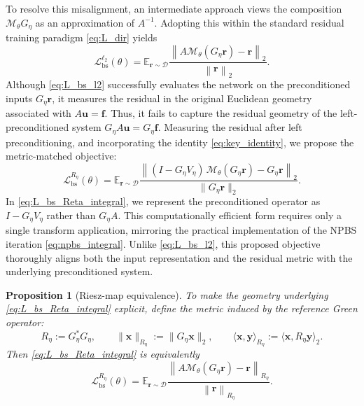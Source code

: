 \documentclass{article}
\providecommand{\E}{\mathbb{E}}
\theoremstyle{plain}
\newtheorem{proposition}{Proposition}[section]
\theoremstyle{remark}
\begin{document}
To resolve this misalignment, an intermediate approach views the composition $\mathcal{M}_\theta G_\eta$ as an approximation of $A^{-1}$. Adopting this within the standard residual training paradigm \eqref{eq:L_dir} yields
\begin{equation}
\mathcal{L}_{\mathrm{bs}}^{\ell_2}(\theta)
=
\E_{\bm r\sim\mathcal{D}}
\frac{
\left\lVert A\mathcal{M}_\theta(G_\eta \bm r)-\bm r\right\rVert_{2}
}{
\left\lVert \bm r\right\rVert_{2}
}.
\label{eq:L_bs_l2}
\end{equation}
Although \eqref{eq:L_bs_l2} successfully evaluates the network on the preconditioned inputs $G_\eta \bm r$, it measures the residual in the original Euclidean geometry associated with $A\bm u=\bm f$. Thus, it fails to capture the residual geometry of the left-preconditioned system $G_\eta A \bm u = G_\eta \bm f$. Measuring the residual after left preconditioning, and incorporating the identity \eqref{eq:key_identity}, we propose the metric-matched objective:
\begin{equation}
\mathcal{L}_{\mathrm{bs}}^{R_\eta}(\theta)
=
\E_{\bm r\sim\mathcal{D}}
\frac{
\left\|
(I-G_\eta V_\eta)\,\mathcal{M}_\theta(G_\eta \bm r)-G_\eta \bm r
\right\|_2
}{
\|G_\eta \bm r\|_2
}.
\label{eq:L_bs_Reta_integral}
\end{equation}
In \eqref{eq:L_bs_Reta_integral}, we represent the preconditioned operator as $I-G_\eta V_\eta$ rather than $G_\eta A$. This computationally efficient form requires only a single transform application, mirroring the practical implementation of the NPBS iteration \eqref{eq:npbs_integral}. Unlike \eqref{eq:L_bs_l2}, this proposed objective thoroughly aligns both the input representation and the residual metric with the underlying preconditioned system.




\begin{proposition}[Riesz-map equivalence]
\label{prop:riesz_map}
To make the geometry underlying \eqref{eq:L_bs_Reta_integral} explicit, define the metric induced by the reference Green operator:
\begin{equation}
R_\eta:=G_\eta^\ast G_\eta,\qquad
\|\bm x\|_{R_\eta}:=\|G_\eta \bm x\|_2,\qquad
\langle \bm x,\bm y\rangle_{R_\eta}:=\langle \bm x,R_\eta \bm y\rangle_2.
\end{equation}
Then \eqref{eq:L_bs_Reta_integral} is equivalently
\begin{equation}
\mathcal{L}_{\mathrm{bs}}^{R_\eta}(\theta)
=
\E_{\bm r\sim\mathcal{D}}
\frac{
\left\lVert A\mathcal{M}_\theta(G_\eta \bm r)-\bm r\right\rVert_{R_\eta}
}{
\left\lVert \bm r\right\rVert_{R_\eta}
}.
\label{eq:L_bs_Reta_riesz}
\end{equation}
\end{proposition}
\end{document}
